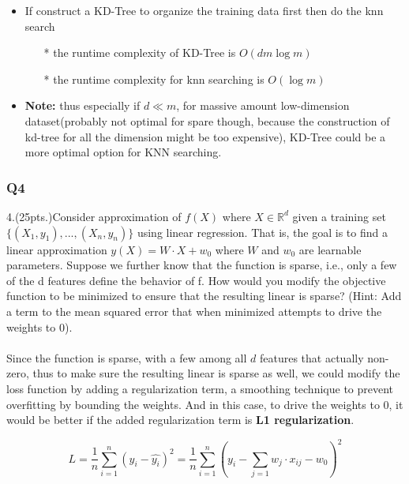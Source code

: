 \documentclass[11pt]{article}
\providecommand{\tightlist}{%
      \setlength{\itemsep}{0pt}\setlength{\parskip}{0pt}}
\begin{document}
\begin{itemize}
\tightlist
\item
  If construct a KD-Tree to organize the training data first then do the
  knn search

  \begin{itemize}
  \tightlist
  \item[*]
    the runtime complexity of KD-Tree is \(O(d m \log m)\)
  \item[*]
    the runtime complexity for knn searching is \(O(\log m)\)
  \end{itemize}
\item
  \textbf{Note:} thus especially if \(d \ll m\), for massive amount
  low-dimension dataset(probably not optimal for spare though, because the
  construction of kd-tree for all the dimension might be too expensive), KD-Tree could be a more optimal option for KNN searching.
\end{itemize}

    \subsubsection*{Q4}\label{q4}

    4.(25pts.)Consider approximation of \(f(X)\) where
\(X \in \mathbb{R}^d\) given a training set
\(\{(X_1, y_1), ..., (X_n, y_n)\}\) using linear regression. That is,
the goal is to find a linear approximation \(y(X) = W \cdot X + w_0\)
where \(W\) and \(w_0\) are learnable parameters. Suppose we further
know that the function is sparse, i.e., only a few of the d features
define the behavior of f. How would you modify the objective function to
be minimized to ensure that the resulting linear is sparse? (Hint: Add a
term to the mean squared error that when minimized attempts to drive the
weights to 0).\\\\

\noindent    Since the function is sparse, with a few among all \(d\) features that
actually non-zero, thus to make sure the resulting linear is sparse as
well, we could modify the loss function by adding a regularization term,
a smoothing technique to prevent overfitting by bounding the weights.
And in this case, to drive the weights to 0, it would be better if the
added regularization term is \textbf{L1 regularization}.

\[L = \frac{1}{n} \sum^n_{i=1} (y_i - \hat {y_i})^2 = \frac{1}{n} \sum^n_{i=1} (y_i - \sum_{j=1}w_j \cdot x_{ij} -w_0)^2\]
\end{document}
